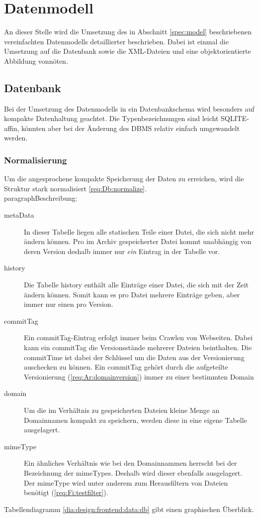 \chapter{Datenmodell}
\liable{\cii}
An dieser Stelle wird die Umsetzung des in Abschnitt \ref{spec:model} 
beschriebenen vereinfachten Datenmodells detaillierter beschrieben. 
Dabei ist einmal die Umsetzung auf die Datenbank sowie die XML-Dateien und eine objektorientierte
Abbildung vonnöten.

\section{Datenbank}
Bei der Umsetzung des Datenmodells in ein Datenbankschema wird besonders auf kompakte Datenhaltung geachtet. 
Die Typenbezeichnungen sind leicht SQLITE-affin, könnten aber bei der Änderung des DBMS relativ einfach umgewandelt werden.
\subsection{Normalisierung} Um die angesprochene kompakte Speicherung der Daten zu erreichen,
wird die Struktur stark normalisiert \ref{req:Db:normalize}. \\ 
paragraph{Beschreibung:}
\begin{description}
	\item [metaData]
		In dieser Tabelle liegen alle statischen Teile einer Datei, die sich nicht mehr
		ändern können. 
		Pro im Archiv gespeicherter Datei kommt unabhängig von deren Version deshalb 
		immer nur \emph{ein} Eintrag in der Tabelle vor.
	\item [history]
		Die Tabelle history enthält alle Einträge einer Datei, die sich mit der Zeit ändern
		können. Somit kann es pro Datei mehrere Einträge geben, aber immer nur einen pro Version.
	\item [commitTag]
		Ein commitTag-Eintrag erfolgt immer beim Crawlen von Webseiten. Dabei kann ein
		commitTag die Versionsstände mehrerer Dateien beinthalten.
		Die commitTime ist dabei der Schlüssel um die Daten aus der Versionierung
		auschecken zu können.
		Ein commitTag gehört durch die aufgeteilte Versionierung (\ref{req:Ar:domainversion}) immer zu einer bestimmten Domain
	\item [domain]
		Um die im Verhältnis zu gespeicherten Dateien kleine Menge an Domainnamen kompakt zu speichern,
		werden diese in eine eigene Tabelle ausgelagert.
	\item [mimeType]
		Ein ähnliches Verhältnis wie bei den Domainnammen herrscht bei der Bezeichnung der mimeTypes.
		Deshalb wird dieser ebenfalls ausgelagert.
		Der mimeType wird unter anderem zum Herausfiltern von Dateien benötigt (\ref{req:Fi:testfilter}).
\end{description}
Tabellendiagramm \ref{dia:design:frontend:data:db} gibt einen graphischen Überblick.

